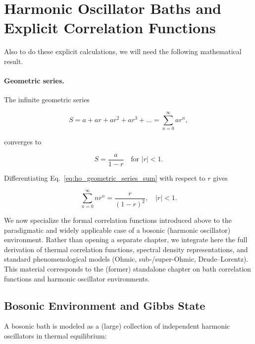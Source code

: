 \section{Harmonic Oscillator Baths and Explicit Correlation Functions}
\label{sec:harmonic_oscillator_baths}
Also to do these explicit calculations, we will need the following mathematical result.
\paragraph{Geometric series.}
The infinite geometric series

\begin{equation} \label{eq:ho_infinite_geometric_series}
	S = a + ar + ar^2 + ar^3 + \dots = \sum_{n=0}^{\infty} ar^n,
\end{equation}

\noindent
converges to

\begin{equation} \label{eq:ho_geometric_series_sum}
	S = \frac{a}{1-r} \quad \text{for } |r|<1.
\end{equation}

\noindent
Differentiating Eq.~\eqref{eq:ho_geometric_series_sum} with respect to $r$ gives

\begin{equation} \label{eq:ho_derivation_geometric_sum}
	\sum_{n=0}^{\infty} n r^n = \frac{r}{(1-r)^2}, \quad |r|<1.
\end{equation}



\noindent
We now specialize the formal correlation functions introduced above to the paradigmatic and widely applicable case of a bosonic (harmonic oscillator) environment. Rather than opening a separate chapter, we integrate here the full derivation of thermal correlation functions, spectral density representations, and standard phenomenological models (Ohmic, sub-/super-Ohmic, Drude--Lorentz). This material corresponds to the (former) standalone chapter on bath correlation functions and harmonic oscillator environments.


\subsection{Bosonic Environment and Gibbs State}
\label{subsec:bosonic_environment_gibbs}

\noindent
A bosonic bath is modeled as a (large) collection of independent harmonic oscillators in thermal equilibrium:

